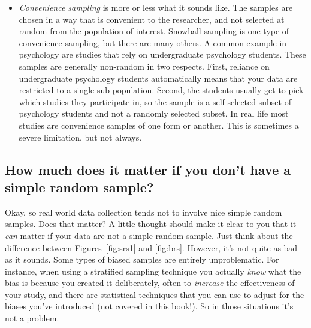 \begin{itemize}
\item {\it Convenience sampling} is more or less what it sounds like. The samples are chosen in a way that is convenient to the researcher, and not selected at random from the population of interest. Snowball sampling is one type of convenience sampling, but there are many others. A common example in psychology are studies that rely on undergraduate psychology students. These samples are generally non-random in two respects. First, reliance on undergraduate psychology students automatically means that your data are restricted to a single sub-population. Second, the students usually get to pick which studies they participate in, so the sample is a self selected subset of psychology students and not a randomly selected subset. In real life most studies are convenience samples of one form or another. This is sometimes a severe limitation, but not always.
\end{itemize}

\subsection{How much does it matter if you don't have a simple random sample?}

Okay, so real world data collection tends not to involve nice simple random samples. Does that matter? A little thought should make it clear to you that it {\it can} matter if your data are not a simple random sample. Just think about the difference between Figures~\ref{fig:srs1} and \ref{fig:brs}. However, it's not quite as bad as it sounds. Some types of biased samples are entirely unproblematic. For instance, when using a stratified sampling technique you actually {\it know} what the bias is because you created it deliberately, often to {\it increase} the effectiveness of your study, and there are statistical techniques that you can use to adjust for the biases you've introduced (not covered in this book!). So in those situations it's not a problem. 

